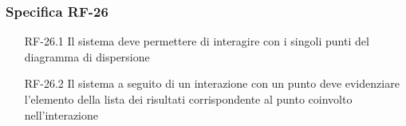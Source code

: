 \subsubsection{Specifica RF-26}
\label{subsubsec:RF-26}
\begin{enumerate}
    \item[RF-26.1] Il sistema deve permettere di interagire con i singoli punti del diagramma di dispersione
    \item[RF-26.2] Il sistema a seguito di un interazione con un punto deve evidenziare l'elemento della lista dei risultati corrispondente al punto coinvolto nell'interazione
\end{enumerate}




